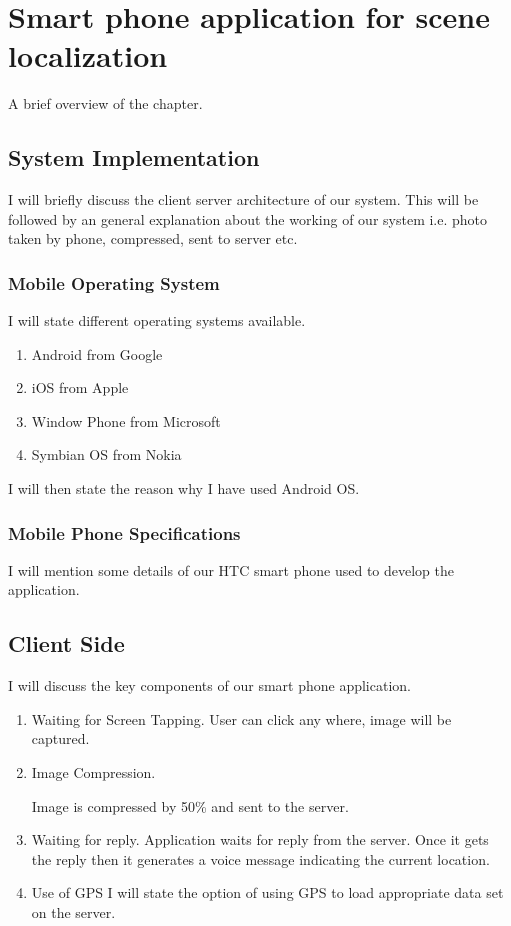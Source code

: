 \chapter{Smart phone application for scene localization}
A brief overview of the chapter. 

\section{System Implementation}
I will briefly discuss the client server architecture 
of our system. This will be followed by an general 
explanation about the working of our system 
i.e. photo taken by phone, compressed, sent to server etc.

\subsection{Mobile Operating System}
I will state different operating systems 
available. 
\begin{enumerate}
\item Android from Google
\item iOS from Apple
\item Window Phone from Microsoft
\item Symbian OS from Nokia
\end{enumerate}

I will then state the reason why I have used 
Android OS. 

\subsection{Mobile Phone Specifications}
I will mention some details of our HTC smart phone 
used to develop the application.

\section{Client Side}
I will discuss the key components of 
our smart phone application.
\begin{enumerate}
\item Waiting for Screen Tapping.
User can click any where, image will be captured.  
\item Image Compression.

Image is compressed by 50\% and sent to 
the server.

\item Waiting for reply.
Application waits for reply from the server.
Once it gets the reply then it generates 
a voice message indicating the current location.

\item Use of GPS
I will state the option of using GPS to load 
appropriate data set on the server.
\end{enumerate}

